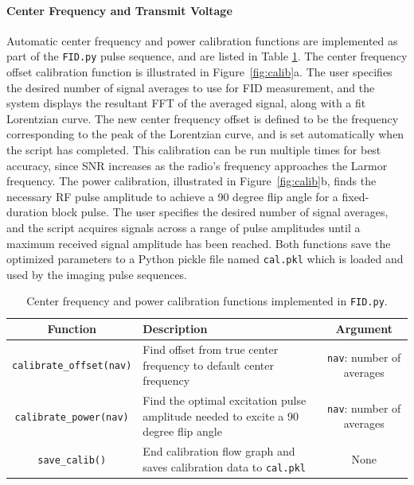 \documentclass[review]{elsarticle}
\begin{document}
\paragraph{Center Frequency and Transmit Voltage} Automatic center frequency and power
calibration functions are implemented as part of the \texttt{FID.py} pulse sequence, 
and are listed in Table \ref{table:calib_functions}.
The center frequency offset calibration function is illustrated in Figure~\ref{fig:calib}a.  
The user specifies the desired number of signal averages to use for FID measurement, 
and the system displays the resultant FFT of the averaged signal, along with a fit Lorentzian curve.
The new center frequency offset is defined to be the frequency corresponding to the peak of the Lorentzian curve, 
and is set automatically when the script has completed.  
This calibration can be run multiple times for best accuracy, 
since SNR increases as the radio's frequency approaches the Larmor frequency.
The power calibration, illustrated in Figure~\ref{fig:calib}b, 
finds the necessary RF pulse amplitude to achieve a 90 degree flip angle for a fixed-duration block pulse.  
The user specifies the desired number of signal averages, 
and the script acquires signals across a range of pulse amplitudes until a maximum received signal amplitude has been reached.
Both functions save the optimized parameters to a Python pickle file named \texttt{cal.pkl} 
which is loaded and used by the imaging pulse sequences.  

\begin{table}
\begin{tabularx}{\textwidth}{| c | X | c |}
	\hline
	\textbf{Function} & \textbf{Description} & \textbf{Argument}  \\ \hline
	\texttt{calibrate\_offset(nav)} & Find offset from true center frequency to default center frequency & \texttt{nav}: number of averages\\ \hline
	\texttt{calibrate\_power(nav)} & Find the optimal excitation pulse amplitude needed to excite a 90 degree flip angle & \texttt{nav}: number of averages\\ \hline
	\texttt{save\_calib()} & End calibration flow graph and saves calibration data to \texttt{cal.pkl} & None\\ \hline	
\end{tabularx}
\caption{Center frequency and power calibration functions implemented in \texttt{FID.py}.}
\label{table:calib_functions}
\end{table}
\end{document}
